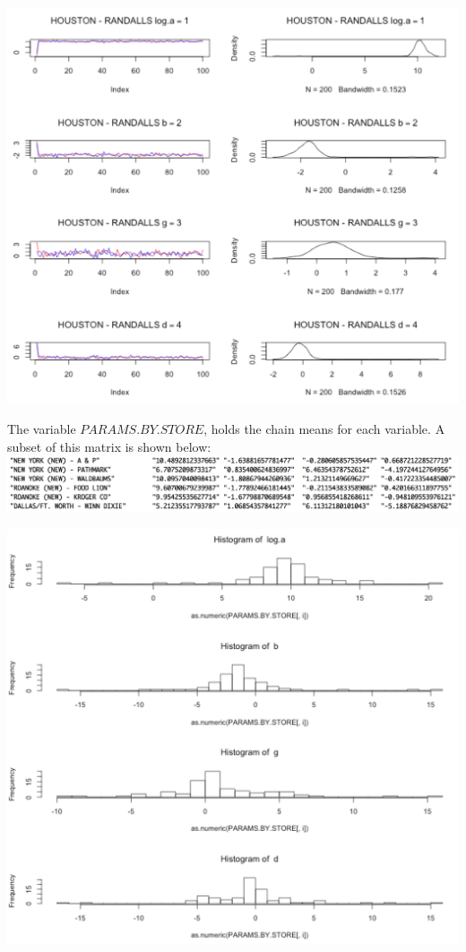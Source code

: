 \documentclass[12pt,letterpaper]{article}\usepackage[]{graphicx}\usepackage[]{color}
\begin{document}
\includegraphics[width=\textwidth]{store-example.png}

The variable $PARAMS.BY.STORE$, holds the chain means for each variable. A
subset of this matrix is shown below:\\

\includegraphics[width=\textwidth]{PARAMS-BY-STORE-example.png}

\includegraphics[width=\textwidth]{inspect-results.png}
\end{document}
